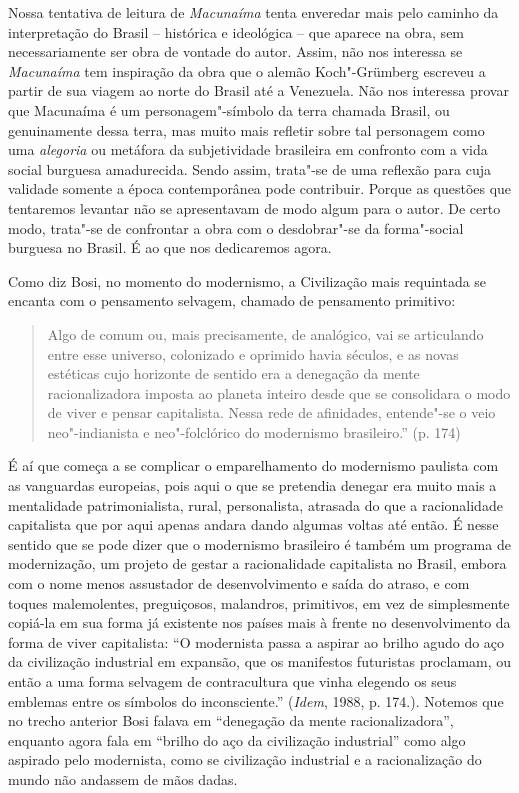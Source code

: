 {Nossa tentativa de leitura de \emph{Macunaíma} tenta enveredar mais pelo
caminho da interpretação do Brasil -- histórica e ideológica -- que
aparece na obra, sem necessariamente ser obra de vontade do autor.
Assim, não nos interessa se \emph{Macunaíma} tem inspiração da obra que
o alemão Koch"-Grümberg escreveu a partir de sua viagem ao norte do
Brasil até a Venezuela. Não nos interessa provar que Macunaíma é um
personagem"-símbolo da terra chamada Brasil, ou genuinamente dessa terra,
mas muito mais refletir sobre tal personagem como uma \emph{alegoria} ou
metáfora da subjetividade brasileira em confronto com a vida social
burguesa amadurecida. Sendo assim, trata"-se de uma reflexão para cuja
validade somente a época contemporânea pode contribuir. Porque as
questões que tentaremos levantar não se apresentavam de modo algum para
o autor. De certo modo, trata"-se de confrontar a obra com o
desdobrar"-se da forma"-social burguesa no Brasil. É ao que nos
dedicaremos agora.

Como diz Bosi, no momento do modernismo, a Civilização mais requintada
se encanta com o pensamento selvagem, chamado de pensamento primitivo:

\begin{quote}
Algo de comum ou, mais precisamente, de analógico, vai se articulando
entre esse universo, colonizado e oprimido havia séculos, e as novas
estéticas cujo horizonte de sentido era a denegação da mente
racionalizadora imposta ao planeta inteiro desde que se consolidara o
modo de viver e pensar capitalista. Nessa rede de afinidades, entende"-se
o veio neo"-indianista e neo"-folclórico do modernismo brasileiro.'' (p.
174)
\end{quote}

É aí que começa a se complicar o emparelhamento do modernismo paulista
com as vanguardas europeias, pois aqui o que se pretendia denegar era
muito mais a mentalidade patrimonialista, rural, personalista, atrasada
do que a racionalidade capitalista que por aqui apenas andara dando
algumas voltas até então. É nesse sentido que se pode dizer que o
modernismo brasileiro é também um programa de modernização, um projeto
de gestar a racionalidade capitalista no Brasil, embora com o nome menos
assustador de desenvolvimento e saída do atraso, e com toques
malemolentes, preguiçosos, malandros, primitivos, em vez de simplesmente
copiá-la em sua forma já existente nos países mais à frente no
desenvolvimento da forma de viver capitalista: ``O modernista passa a
aspirar ao brilho agudo do aço da civilização industrial em expansão,
que os manifestos futuristas proclamam, ou então a uma forma selvagem de
contracultura que vinha elegendo os seus emblemas entre os símbolos do
inconsciente.'' (\emph{Idem}, 1988, p. 174.). Notemos que no trecho anterior
Bosi falava em ``denegação da mente racionalizadora'', enquanto agora
fala em ``brilho do aço da civilização industrial'' como algo aspirado
pelo modernista, como se civilização industrial e a racionalização do
mundo não andassem de mãos dadas.

}
